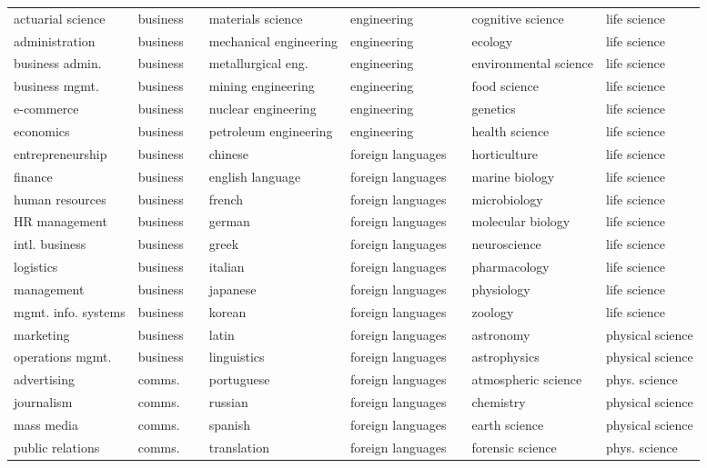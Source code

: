 \begin{table}[ht]
\begin{tabular}{ll p{0.5cm} ll p{0.5cm} ll}
actuarial science & business && materials science & engineering && cognitive science & life science \\
administration & business && mechanical engineering & engineering && ecology & life science \\
business admin. & business && metallurgical eng. & engineering && environmental science & life science \\
business mgmt. & business && mining engineering & engineering && food science & life science \\
e-commerce & business && nuclear engineering & engineering && genetics & life science \\
economics & business && petroleum engineering & engineering && health science & life science \\
entrepreneurship & business && chinese & foreign languages && horticulture & life science \\
finance & business && english language & foreign languages && marine biology & life science \\
human resources & business && french & foreign languages && microbiology & life science \\
HR management & business && german & foreign languages && molecular biology & life science \\
intl. business & business && greek & foreign languages && neuroscience & life science \\
logistics & business && italian & foreign languages && pharmacology & life science \\
management & business && japanese & foreign languages && physiology & life science \\
mgmt. info. systems & business && korean & foreign languages && zoology & life science \\
marketing & business && latin & foreign languages && astronomy & physical science \\
operations mgmt. & business && linguistics & foreign languages && astrophysics & physical science \\
advertising & comms. && portuguese & foreign languages && atmospheric science & phys. science \\
journalism & comms. && russian & foreign languages && chemistry & physical science \\
mass media & comms. && spanish & foreign languages && earth science & physical science \\
public relations & comms. && translation & foreign languages && forensic science & phys. science \\

\end{tabular}
\end{table}
